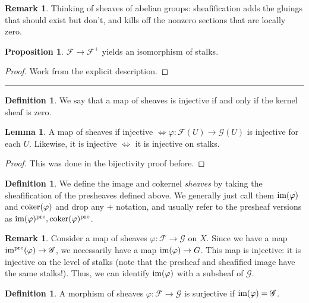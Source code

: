 \documentclass[10pt,reqno]{amsart}
\theoremstyle{definition}
\newtheorem{definition}[theorem]{Definition}
\newtheorem{proposition}[theorem]{Proposition}
\newtheorem{lemma}[theorem]{Lemma}
\newtheorem{remark}[theorem]{Remark}
\theoremstyle{remark}
\numberwithin{equation}{section}
\numberwithin{theorem}{section}
\newcommand{\FF}{{\mathscr F}}
\newcommand{\GG}{{\mathscr G}}
\begin{document}
\begin{remark} Thinking of sheaves of abelian groups: sheafification adds the gluings that should exist but don't, and kills off the nonzero sections that are locally zero.
\end{remark}

\begin{proposition} $\FF \to \FF^+$ yields an isomorphism of stalks.
\end{proposition}
\begin{proof} Work from the explicit description.
\end{proof}

\hrule
\vspace{1em}

\begin{definition} We say that a map of sheaves is injective if and only if the kernel sheaf is zero.
\end{definition}

\begin{lemma} A map of sheaves if injective $\iff \varphi: \FF(U) \to \GG(U)$ is injective for each $U$. Likewise, it is injective $\iff$ it is injective on stalks.
\end{lemma}
\begin{proof}
This was done in the bijectivity proof before.
\end{proof}

\begin{definition} We define the image and cokernel \textit{sheaves} by taking the sheafification of the presheaves defined above. We generally just call them $\textup{im}(\varphi)$ and $\textup{coker}(\varphi)$ and drop any $+$ notation, and usually refer to the presheaf versions as $\textup{im}(\varphi)^{\textup{pre}}, \textup{coker}(\varphi)^{\textup{pre}}$.
\end{definition}

\begin{remark} Consider a map of sheaves $\varphi: \FF \to \GG$ on $X$. Since we have a map $\textup{im}^{\textup{pre}}(\varphi) \to \GG$, we necessarily have a map $\textup{im}(\varphi) \to G$. This map is injective: it is injective on the level of stalks (note that the presheaf and sheafified image have the same stalks!). Thus, we can identify $\textup{im}(\varphi)$ with a subsheaf of $\GG$.
\end{remark}

\begin{definition} A morphism of sheaves $\varphi: \FF \to \GG$ is surjective if $\textup{im}(\varphi) = \GG$.
\end{definition}
\end{document}
